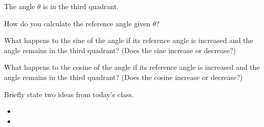 \begin{problem}
  \clearpage

  \item The angle $\theta$ is in the third quadrant.
  \begin{subproblem}
    \item How do you calculate the reference angle given $\theta$?
      \vfill
    \item What happens to the sine of the angle if its reference angle is
      increased and the angle remains in the third quadrant? (Does the
      sine increase or decrease?)
      \vfill
    \item What happens to the cosine of the angle if its reference angle is
      increased and the angle remains in the third quadrant? (Does the
      cosine increase or decrease?)
      \vfill
  \end{subproblem}

\end{problem}

\postClass

\begin{problem}
\item Briefly state two ideas from today's class.
  \begin{itemize}
  \item
  \item
  \end{itemize}
\item
  \begin{subproblem}
    \item
  \end{subproblem}
\end{problem}


